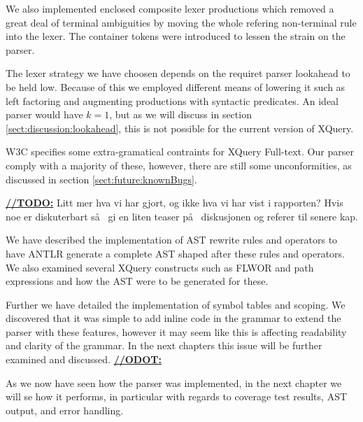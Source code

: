 We also implemented enclosed composite lexer productions which removed a great
deal of terminal ambiguities by moving the whole refering non-terminal rule
into the lexer. The container tokens were introduced to lessen the strain on
the parser.

The lexer strategy we have choosen depends on the requiret parser lookahead to be held low. Because of this we employed different means of lowering it such as left factoring and augmenting productions with syntactic predicates. An ideal parser would have $k=1$, but as we will discuss in section \ref{sect:discussion:lookahead}, this is not possible for the current version of XQuery.

W3C specifies some extra-gramatical contraints for XQuery Full-text. Our parser
comply with a majority of these, however, there are still some
unconformities, as discussed in section \ref{sect:future:knownBugs}.  

\underline{\textbf{\LARGE //TODO:}} Litt mer hva vi har gjort, og ikke hva vi har vist i rapporten? Hvis noe er diskuterbart s\aa~ gi en liten teaser p\aa~ diskusjonen og referer til senere kap.

We have described the implementation of AST rewrite rules and operators to have
ANTLR generate a complete AST shaped after these rules and operators. We also
examined several XQuery constructs such as FLWOR and path expressions and how
the AST were to be generated for these.

Further we have detailed the implementation of symbol tables and scoping. We
discovered that it was simple to add inline code in the grammar to extend the
parser with these features, however it may seem like this is affecting
readability and clarity of the grammar. In the next chapters this issue will be
further examined and discussed.
\underline{\textbf{\LARGE //ODOT:}}


As we now have seen how the parser was implemented, in the next chapter we will
se how it performs, in particular with regards to coverage test results, AST
output, and error handling.
